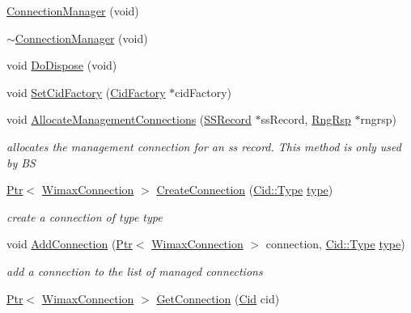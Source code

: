 \begin{DoxyCompactItemize}
\item 
\hyperlink{classns3_1_1ConnectionManager_a957bbaeafaee3aad066502d338cf79de}{Connection\+Manager} (void)
\item 
\hyperlink{classns3_1_1ConnectionManager_af13830c31a39b7a73b8f2695ea44d85b}{$\sim$\+Connection\+Manager} (void)
\item 
void \hyperlink{classns3_1_1ConnectionManager_a378620026677869149925c99467020d3}{Do\+Dispose} (void)
\item 
void \hyperlink{classns3_1_1ConnectionManager_ad00aeb2605b1a63af132760f1cf2c52c}{Set\+Cid\+Factory} (\hyperlink{classns3_1_1CidFactory}{Cid\+Factory} $\ast$cid\+Factory)
\item 
void \hyperlink{classns3_1_1ConnectionManager_a3eeae1aedd0ae2ced29065c0efbc3977}{Allocate\+Management\+Connections} (\hyperlink{classns3_1_1SSRecord}{S\+S\+Record} $\ast$ss\+Record, \hyperlink{classns3_1_1RngRsp}{Rng\+Rsp} $\ast$rngrsp)
\begin{DoxyCompactList}\small\item\em allocates the management connection for an ss record. This method is only used by BS \end{DoxyCompactList}\item 
\hyperlink{classns3_1_1Ptr}{Ptr}$<$ \hyperlink{classns3_1_1WimaxConnection}{Wimax\+Connection} $>$ \hyperlink{classns3_1_1ConnectionManager_aaec72a700ee59aa15f5495b9dcb2abc1}{Create\+Connection} (\hyperlink{classns3_1_1Cid_a10b8f92080ca5790e65a0bfa2f557e0a}{Cid\+::\+Type} \hyperlink{visualizer-ideas_8txt_add98db9e15e2a58cf2b57623e7aa893a}{type})
\begin{DoxyCompactList}\small\item\em create a connection of type type \end{DoxyCompactList}\item 
void \hyperlink{classns3_1_1ConnectionManager_ad629aae5afc5f487fad910bf3f396dde}{Add\+Connection} (\hyperlink{classns3_1_1Ptr}{Ptr}$<$ \hyperlink{classns3_1_1WimaxConnection}{Wimax\+Connection} $>$ connection, \hyperlink{classns3_1_1Cid_a10b8f92080ca5790e65a0bfa2f557e0a}{Cid\+::\+Type} \hyperlink{visualizer-ideas_8txt_add98db9e15e2a58cf2b57623e7aa893a}{type})
\begin{DoxyCompactList}\small\item\em add a connection to the list of managed connections \end{DoxyCompactList}\item 
\hyperlink{classns3_1_1Ptr}{Ptr}$<$ \hyperlink{classns3_1_1WimaxConnection}{Wimax\+Connection} $>$ \hyperlink{classns3_1_1ConnectionManager_a83d4372dff6bfbf36e4036a2c0cdc66b}{Get\+Connection} (\hyperlink{classns3_1_1Cid}{Cid} cid)

\end{DoxyCompactItemize}
